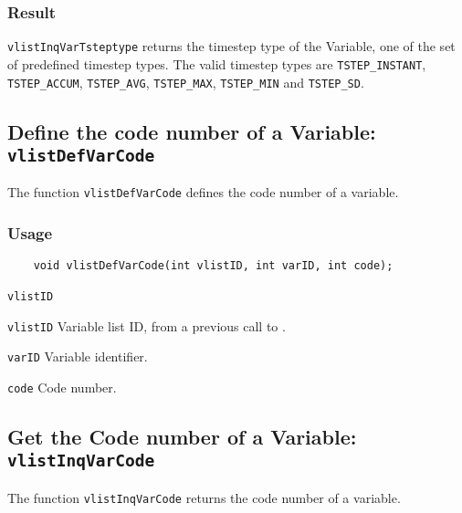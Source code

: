 \subsubsection*{Result}

{\texttt{vlistInqVarTsteptype}} returns the timestep type of the Variable,
one of the set of predefined {\CDI} timestep types.
The valid {\CDI} timestep types are {\texttt{TSTEP\_INSTANT}},
{\texttt{TSTEP\_ACCUM}}, {\texttt{TSTEP\_AVG}}, {\texttt{TSTEP\_MAX}}, {\texttt{TSTEP\_MIN}} and {\texttt{TSTEP\_SD}}.



\subsection{Define the code number of a Variable: \texttt{vlistDefVarCode}}
\label{vlistDefVarCode}

The function {\texttt{vlistDefVarCode}} defines the code number of a variable.

\subsubsection*{Usage}

\begin{verbatim}
    void vlistDefVarCode(int vlistID, int varID, int code);
\end{verbatim}

\hspace*{4mm}\begin{minipage}[]{15cm}
\begin{deflist}{\texttt{vlistID}\ }
\item[\texttt{vlistID}]
Variable list ID, from a previous call to {}.
\item[\texttt{varID}]
Variable identifier.
\item[\texttt{code}]
Code number.

\end{deflist}
\end{minipage}


\subsection{Get the Code number of a Variable: \texttt{vlistInqVarCode}}
\label{vlistInqVarCode}

The function {\texttt{vlistInqVarCode}} returns the code number of a variable.

